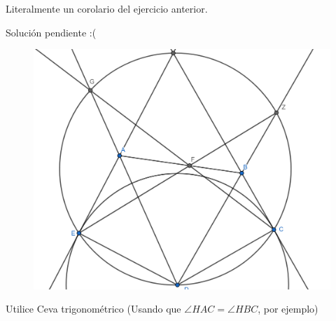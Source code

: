 \begin{sol}
	Literalmente un corolario del ejercicio anterior. 
\end{sol}

\begin{sol}
	Soluci\'on pendiente :(
	\begin{figure}[h!]
		\centering
		\includegraphics[scale=0.4]{Imgs/JT4.png}
	\end{figure}
\end{sol}

\begin{sol}
	Utilice Ceva trigonom\'etrico (Usando que $\angle HAC = \angle HBC$, por ejemplo)
	
\end{sol}